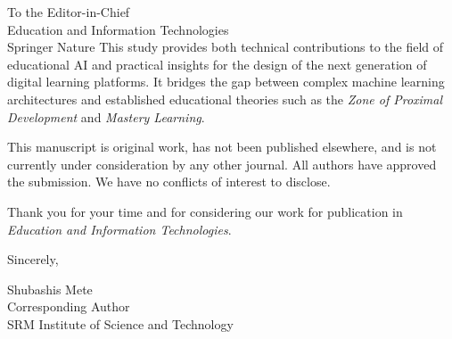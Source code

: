 \documentclass[11pt]{letter}
\begin{document}
\begin{letter}{To the Editor-in-Chief \\
Education and Information Technologies \\
Springer Nature}
This study provides both technical contributions to the field of educational AI and practical insights for the design of the next generation of digital learning platforms. It bridges the gap between complex machine learning architectures and established educational theories such as the \textit{Zone of Proximal Development} and \textit{Mastery Learning}.

This manuscript is original work, has not been published elsewhere, and is not currently under consideration by any other journal. All authors have approved the submission. We have no conflicts of interest to disclose.

Thank you for your time and for considering our work for publication in \textit{Education and Information Technologies}.

\closing{Sincerely,}

\vspace{0.5cm}
Shubashis Mete \\
Corresponding Author \\
SRM Institute of Science and Technology

\end{letter}
\end{document}
